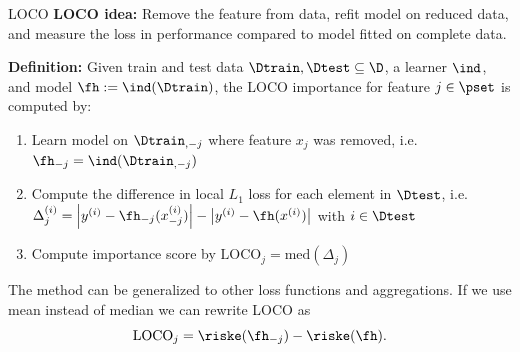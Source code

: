 \documentclass[11pt,compress,t,notes=noshow, aspectratio=169, xcolor=table]{beamer}
\begin{document}
\begin{frame}{LOCO  }
%
\textbf{LOCO idea:} Remove the feature from data, refit model on reduced data, and measure the loss in performance compared to model fitted on complete data. %

\pause\medskip

\textbf{Definition:} Given train and test data $\Dtrain, \Dtest \subseteq \D$, a learner $\ind$, and model $\fh := \ind(\Dtrain)$, the LOCO importance for feature $j \in \pset$ is computed by:

\medskip

  \begin{enumerate}
    \item Learn model on ${\Dtrain}_{,-j}$ where feature $x_j$ was removed, i.e. $\fh_{-j} = \ind({\Dtrain}_{,-j})$\pause
    \item Compute the difference in local $L_1$ loss for each element in $\Dtest$, i.e. $\Delta_j^{(i)} = \left  |y^{(i)} - \fh_{-j}(x_{-j}^{(i)}) \right | - \left |y^{(i)} - \fh(x^{(i)}) \right | $ with $i \in \Dtest$\pause
    \item Compute importance score by $\text{LOCO}_j = \text{med} \left ( \Delta_j  \right )$
  \end{enumerate}

\medskip\pause

The method can be generalized to other loss functions and aggregations. If we use mean instead of median we can rewrite LOCO as
%
$$ \text{LOCO}_j = \riske(\fh_{-j}) - \riske(\fh).$$
\end{frame}
\end{document}
